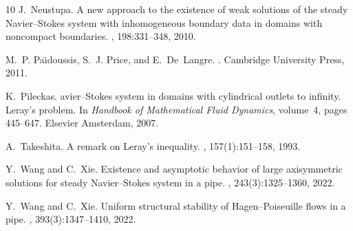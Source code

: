 \documentclass[11pt]{article}
\numberwithin{equation}{section}
\numberwithin{figure}{section}
\begin{document}
\begin{thebibliography}{10}
J.~Neustupa.
\newblock A new approach to the existence of weak solutions of the steady
  {N}avier--{S}tokes system with inhomogeneous boundary data in domains with
  noncompact boundaries.
, 198:331--348,
  2010.

M.~P. Pa{\"\i}doussis, S.~J. Price, and E.~De~Langre.
.
\newblock Cambridge University Press, 2011.

K.~Pileckas.
avier--{S}tokes system in domains with cylindrical outlets to
  infinity. {L}eray’s problem.
\newblock In {\it Handbook of Mathematical Fluid Dynamics}, volume~4, pages
  445--647. Elsevier Amsterdam, 2007.

A.~Takeshita.
\newblock A remark on {L}eray’s inequality.
, 157(1):151--158, 1993.

Y.~Wang and C.~Xie.
\newblock Existence and asymptotic behavior of large axisymmetric solutions for
  steady {N}avier--{S}tokes system in a pipe.
, 243(3):1325--1360,
  2022.

Y.~Wang and C.~Xie.
\newblock Uniform structural stability of {H}agen--{P}oiseuille flows in a
  pipe.
, 393(3):1347--1410,
  2022.

\end{thebibliography}

\vspace{5mm}
\end{document}
